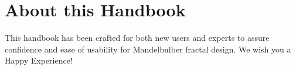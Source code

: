 \section{About this Handbook}

This handbook has been crafted for both new users and experts to assure confidence and ease of usability for Mandelbulber fractal design. We wish you a Happy Experience!
